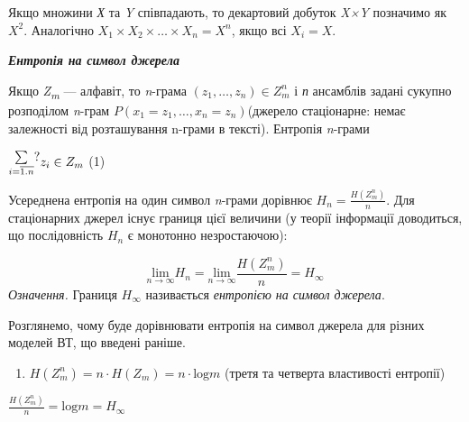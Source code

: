 \bigskip

Якщо множини \textit{Х} та \textit{Y} співпадають, то декартовий добуток
\textit{X×Y} позначимо як  ${X^{{2}}}$. Аналогічно  ${X_{{1}}\times
X_{{2}}\times \dots\times X_{{n}}=X^{{n}}}$, якщо всі 
${X_{{i}}=X}$.


\bigskip


\bigskip

{\centering\bfseries\itshape
Ентропія на символ джерела
\par}


\bigskip


\bigskip

Якщо \textit{Z}\textit{\textsubscript{m}} --- алфавіт, то \textit{n}{}-грама 
${(z_{{1}},\dots,z_{{n}})\in Z_{{m}}^{{n}}}$ і \textit{п}
ансамблів задані сукупно розподілом \textit{n}{}-грам 
${P(x_{{1}}=z_{{1}},\dots,x_{{n}}=z_{{n}})}$(джерело
стаціонарне: немає залежності від розташування n-грами в тексті). Ентропія
\textit{n}{}-грами

{\centering
  $\begin{matrix}\underset{i=\overline{{1\text{.}n}}}{\sum }?\hfill\null
\end{matrix}{z_{{i}}\in Z_{{m}}}\hfill $  (1)
\par}

Усереднена ентропія на один символ \textit{n}{}-грами дорівнює 
${H_{{n}}=\frac{H(Z_{{m}}^{{n}})}{n}}$. Для стаціонарних джерел існує границя
цієї величини (у теорії інформації доводиться, що послідовність  ${H_{{n}}}$ є
монотонно незростаючою):

\begin{equation*}
{\underset{{n\rightarrow \infty }}{{\text{lim}}}H_{{n}}=\underset{{n\rightarrow
\infty }}{{\text{lim}}}\frac{H(Z_{{m}}^{{n}})}{n}=H_{{\infty }}}
\end{equation*}
\textit{Означення.} Границя  ${H_{{\infty }}}$ називається \textit{ентропією на
символ джерела}. 


\bigskip

Розглянемо, чому буде дорівнювати ентропія на символ джерела для різних моделей
ВТ, що введені раніше.

\liststyleWWviiiNumxvi
\begin{enumerate}
\item  ${H(Z_{{m}}^{{n}})=n\cdot H(Z_{{m}})=n\cdot \text{log}m}$ (третя та
четверта властивості ентропії)
\end{enumerate}
{\centering  ${\frac{H(Z_{{m}}^{{n}})}{n}=\text{log}m=H_{{\infty }}}$\par}

